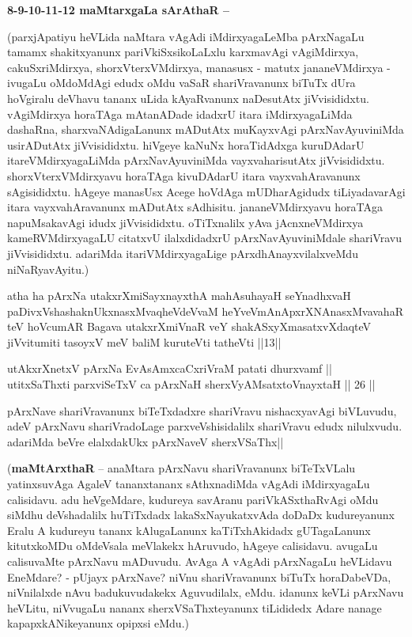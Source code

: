 \textbf{8-9-10-11-12 maMtarxgaLa sArAthaR --}

(parxjApatiyu heVLida naMtara vAgAdi iMdirxyagaLeMba pArxNagaLu tamamx 
shakitxyanunx pariVkiSxsikoLaLxlu karxmavAgi vAgiMdirxya, 
cakuSxriMdirxya, shorxVterxVMdirxya, manasusx - matutx jananeVMdirxya 
- ivugaLu oMdoMdAgi edudx oMdu vaSaR shariVravanunx biTuTx dUra 
hoVgiralu deVhavu tananx uLida kAyaRvanunx naDesutAtx jiVvisididxtu. 
vAgiMdirxya horaTAga mAtanADade idadxrU itara iMdirxyagaLiMda 
dashaRna, sharxvaNAdigaLanunx mADutAtx muKayxvAgi pArxNavAyuviniMda 
usirADutAtx jiVvisididxtu. hiVgeye kaNuNx horaTidAdxga kuruDAdarU 
itareVMdirxyagaLiMda pArxNavAyuviniMda vayxvaharisutAtx jiVvisididxtu. 
shorxVterxVMdirxyavu horaTAga kivuDAdarU itara vayxvahAravanunx 
sAgisididxtu. hAgeye manasUsx Acege hoVdAga mUDharAgidudx 
tiLiyadavarAgi itara vayxvahAravanunx mADutAtx sAdhisitu. 
jananeVMdirxyavu horaTAga napuMsakavAgi idudx jiVvisididxtu. 
oTiTxnalilx yAva jAcnxneVMdirxya kameRVMdirxyagaLU citatxvU 
ilalxdidadxrU pArxNavAyuviniMdale shariVravu jiVvisididxtu. adariMda 
itariVMdirxyagaLige pArxdhAnayxvilalxveMdu niNaRyavAyitu.)

\begin{shl}
atha ha pArxNa utakxrXmiSayxnayxthA mahAsuhayaH seYnadhxvaH paDivxVshashaknUkxnasxMvaqheVdeVvaM heYveVmAnApxrXNAnasxMvavahaR teV hoVcumAR Bagava utakxrXmiVnaR veY shakASxyXmasatxvXdaqteV jiVvitumiti tasoyxV meV baliM kuruteVti tatheVti ||13||
\end{shl}


\begin{shl}
utAkxrXnetxV pArxNa EvAsAmxcaCxriVraM patati dhurxvamf || \\
utitxSaThxti parxviSeTxV ca pArxNaH sherxVyAMsatxtoV\s nayxtaH \hfill|| 26 || 
\end{shl}

\begin{artha}
pArxNave shariVravanunx biTeTxdadxre shariVravu nishacxyavAgi 
biVLuvudu, adeV pArxNavu shariVradoLage parxveVshisidalilx shariVravu 
edudx nilulxvudu. adariMda beVre elalxdakUkx pArxNaveV sherxVSaThx||
\end{artha}


(\textbf{maMtArxthaR} -- anaMtara pArxNavu shariVravanunx biTeTxVLalu 
yatinxsuvAga AgaleV tananxtananx sAthxnadiMda vAgAdi iMdirxyagaLu 
calisidavu. adu heVgeMdare, kudureya savAranu pariVkASxthaRvAgi oMdu 
siMdhu deVshadalilx huTiTxdadx lakaSxNayukatxvAda doDaDx kudureyanunx 
Eralu A kudureyu tananx kAlugaLanunx kaTiTxhAkidadx gUTagaLanunx 
kitutxkoMDu oMdeVsala meVlakekx hAruvudo, hAgeye calisidavu. avugaLu 
calisuvaMte pArxNavu mADuvudu. AvAga A vAgAdi pArxNagaLu heVLidavu 
EneMdare? - pUjayx pArxNave? niVnu shariVravanunx biTuTx horaDabeVDa, 
niVnilalxde nAvu badukuvudakekx Aguvudilalx, eMdu. idanunx keVLi 
pArxNavu heVLitu, niVvugaLu nananx sherxVSaThxteyanunx tiLididedx 
Adare nanage kapapxkANikeyanunx opipxsi eMdu.)

